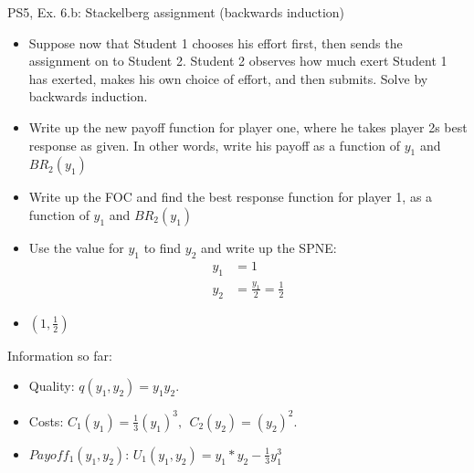 \begin{frame}{PS5, Ex. 6.b: Stackelberg assignment (backwards induction)}
    \begin{itemize}
    \item[(b)] Suppose now that Student 1 chooses his effort first, then sends the assignment on to Student 2. Student 2 observes how much exert Student 1 has exerted, makes his own choice of effort, and then submits. Solve by backwards induction.
    \end{itemize}
    \vfill\null
  \begin{multicols}{2}
    \begin{itemize}
      \item[(Step 1)] Write up the new payoff function for player one, where he takes player 2s best response as given. In other words, write his payoff as a function of \begin{math}y_1\end{math} and \begin{math}BR_2(y_1)\end{math}
      \item[(Step 2)] Write up the FOC and find the best response function for player 1, as a function of \begin{math}y_1\end{math} and \begin{math}BR_2(y_1)\end{math}
      \item[(Step 3)] Use the value for $y_1$ to find $y_2$ and write up the SPNE:
      \begin{align*}
          y_1&=1\\
          y_2&=\frac{y_1}{2}=\frac{1}{2}
      \end{align*}
      \item[SPNE:] \begin{math}\left(1,\frac{1}{2}\right)\end{math}
    \end{itemize}
    \vfill\null \columnbreak
    Information so far:
    \begin{itemize}
        \item[1] Quality: $q(y_1, y_2) = y_1y_2.$\\
        \item[2] Costs: $C_1(y_1) = \frac{1}{3}(y_1)^3,\ \ C_2(y_2) = (y_2)^2.$\\
        \item[3] $Payoff_1(y_1,y_2)$: $U_1(y_1,y_2) = y_1*y_2-\frac{1}{3}y_1^3$ \\

\end{itemize}
\end{multicols}
\end{frame}
